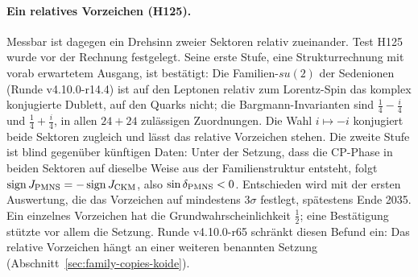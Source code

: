 \paragraph{Ein relatives Vorzeichen (H125).}
Messbar ist dagegen ein Drehsinn zweier Sektoren relativ zueinander. Test H125 wurde vor der Rechnung festgelegt. Seine erste Stufe, eine
Strukturrechnung mit vorab erwartetem Ausgang, ist bestätigt: Die Familien-\(su(2)\) der Sedenionen (Runde v4.10.0-r14.4) ist auf den
Leptonen relativ zum Lorentz-Spin das komplex konjugierte Dublett, auf den Quarks nicht; die Bargmann-Invarianten sind
\(\tfrac14-\tfrac i4\) und \(\tfrac14+\tfrac i4\), in allen \(24+24\) zulässigen Zuordnungen. Die Wahl \(i\mapsto-i\) konjugiert beide Sektoren
zugleich und lässt das relative Vorzeichen stehen. Die zweite Stufe ist blind gegenüber künftigen Daten: Unter der Setzung, dass die
CP-Phase in beiden Sektoren auf dieselbe Weise aus der Familienstruktur entsteht, folgt \(\operatorname{sign}J_{\rm PMNS}=-\operatorname{sign}J_{\rm CKM}\),
also \(\sin\delta_{\rm PMNS}<0\). Entschieden wird mit der ersten Auswertung, die das Vorzeichen auf mindestens \(3\sigma\) festlegt,
spätestens Ende 2035. Ein einzelnes Vorzeichen hat die Grundwahrscheinlichkeit \(\tfrac12\); eine Bestätigung stützte vor allem die Setzung.
Runde v4.10.0-r65 schränkt diesen Befund ein: Das relative Vorzeichen hängt an einer weiteren benannten Setzung
(Abschnitt~\ref{sec:family-copies-koide}).


